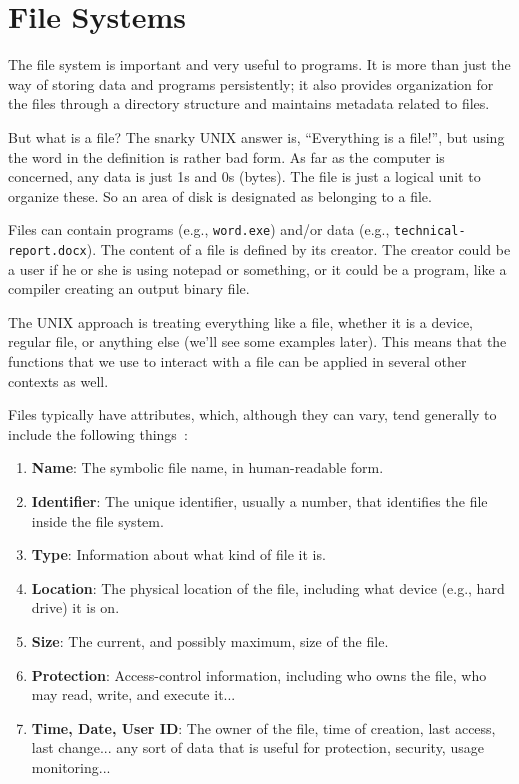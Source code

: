 




\section*{File Systems}

The file system is important and very useful to programs. It is more than just the way of storing data and programs persistently; it also provides organization for the files through a directory structure and maintains metadata related to files.

But what is a file? The snarky UNIX answer is, ``Everything is a file!'', but using the word in the definition is rather bad form. As far as the computer is concerned, any data is just 1s and 0s (bytes). The file is just a logical unit to organize these. So an area of disk is designated as belonging to a file.

Files can contain programs (e.g., \texttt{word.exe}) and/or data (e.g., \texttt{technical-report.docx}). The content of a file is defined by its creator. The creator could be a user if he or she is using notepad or something, or it could be a program, like a compiler creating an output binary file.

The UNIX approach is treating everything like a file, whether it is a device, regular file, or anything else (we'll see some examples later). This means that the functions that we use to interact with a file can be applied in several other contexts as well.

Files typically have attributes, which, although they can vary, tend generally to include the following things~\cite{osc}:

\begin{enumerate}
	\item \textbf{Name}: The symbolic file name, in human-readable form.
	\item \textbf{Identifier}: The unique identifier, usually a number, that identifies the file inside the file system.
	\item \textbf{Type}: Information about what kind of file it is.
	\item \textbf{Location}: The physical location of the file, including what device (e.g., hard drive) it is on.
	\item \textbf{Size}: The current, and possibly maximum, size of the file.
	\item \textbf{Protection}: Access-control information, including who owns the file, who may read, write, and execute it...
	\item \textbf{Time, Date, User ID}: The owner of the file, time of creation, last access, last change... any sort of data that is useful for protection, security, usage monitoring...
\end{enumerate}

